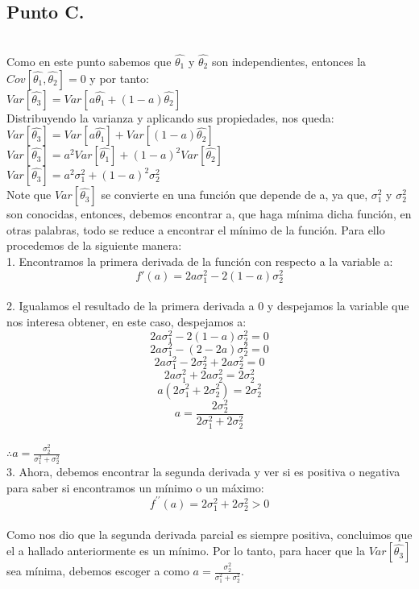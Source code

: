 \documentclass[letterpaper,12pt,onecolumn,titlepage]{article}
\begin{document}
\subsection{Punto C.} 
~\\ Como en este punto sabemos que $\hat{\theta_1}$ y $\hat{\theta_2}$ son independientes, entonces la $Cov[{\hat{\theta_1}},{\hat{\theta_2}}]=0$ y por tanto:
~\\ $Var[\hat{\theta_3}]=Var[a{\hat{\theta_1}}+(1-a){\hat{\theta_2}}]$
~\\ Distribuyendo la varianza y aplicando sus propiedades, nos queda:
~\\ $Var[\hat{\theta_3}]=Var[a{\hat{\theta_1}}]+Var[(1-a){\hat{\theta_2}}]$ 
~\\ $Var[\hat{\theta_3}]=a^2Var[{\hat{\theta_1}}]+(1-a)^2Var[{\hat{\theta_2}}]$
~\\ $Var[\hat{\theta_3}]=a^2\sigma_1^2+(1-a)^2\sigma_2^2$ 
~\\ Note que $Var[\hat{\theta_3}]$ se convierte en una funci\'{o}n que depende de a, ya que, $\sigma_1^2$ y $\sigma_2^2$ son conocidas, entonces, debemos encontrar a, que haga m\'{i}nima dicha funci\'{o}n, en otras palabras, todo se reduce a encontrar el m\'{i}nimo de la funci\'{o}n. Para ello procedemos de la siguiente manera:
~\\ 1. Encontramos la primera derivada de la funci\'{o}n con respecto a la variable a:
~\\ $$f'(a)=2a\sigma_1^2 - 2(1-a)\sigma_2^2$$
~\\ 2. Igualamos el resultado de la primera derivada a 0 y despejamos la variable que nos interesa obtener, en este caso, despejamos a:
$$2a\sigma_1^2 - 2(1-a)\sigma_2^2=0$$
$$2a\sigma_1^2 - (2-2a)\sigma_2^2=0$$
$$2a\sigma_1^2 - 2\sigma_2^2 + 2a\sigma_2^2=0$$
$$2a\sigma_1^2  + 2a\sigma_2^2= 2\sigma_2^2$$
$$a(2\sigma_1^2+2\sigma_2^2)=2\sigma_2^2$$
$$a=\frac{2\sigma_2^2}{2\sigma_1^2+2\sigma_2^2}$$
~\\$\therefore${$a=\frac{\sigma_2^2}{\sigma_1^2+\sigma_2^2}$}
~\\ 3. Ahora, debemos encontrar la segunda derivada y ver si es positiva o negativa para saber si encontramos un m\'{i}nimo o un m\'{a}ximo:
~\\$$f^{\prime\prime}(a)=2\sigma_1^2+2\sigma_2^2 > 0$$
~\\ Como nos dio que la segunda derivada parcial es siempre positiva, concluimos que el a hallado anteriormente es un m\'{i}nimo. Por lo tanto, para hacer que la $Var[\hat{\theta_3}]$ sea m\'{i}nima, debemos escoger a como $a=\frac{\sigma_2^2}{\sigma_1^2+\sigma_2^2}$.
\end{document}
